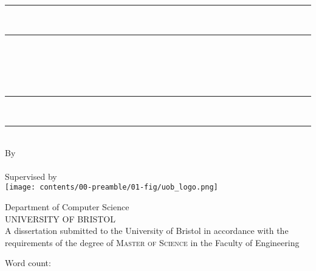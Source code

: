 \begin{titlepage}
    \centering

    \vspace*{2.2cm}

    \rule{\textwidth}{2pt} \\[-2ex]
    \rule{\textwidth}{0.5pt} \\[0.7cm]

    {\LARGE\bfseries \myReportTitle} \\[0.3cm]

    \parbox{0.89\textwidth}{\centering
        {\large \textit{\myReportSubtitle}}
    } \\[0.3cm]

    \rule{\textwidth}{0.5pt} \\[-2ex]
    \rule{\textwidth}{2pt} \\[0.3cm]

    {\large By} \\[0.3cm]
    {\large \myName} \\[0.3cm]
    {\normalsize Supervised by \mySupervisor} \\[1cm]

    \texttt{[image: contents/00-preamble/01-fig/uob\_logo.png]} \\[1cm]

    \begin{minipage}{0.65\textwidth}
        \centering
        {\Large Department of Computer Science} \\[0.3cm]
        {\Large \textsc{UNIVERSITY OF BRISTOL}} \\[1cm]
        {\normalsize A dissertation submitted to the University of Bristol
        in accordance with the requirements of the degree of \textsc{Master of Science}
        in the Faculty of Engineering} \\[1cm]
        {\large \mySubmissionMonthYear}
    \end{minipage}

    \vspace*{1cm}


    \begin{flushright}
        Word count: \wordCount
    \end{flushright}

    \vspace*{2.2cm}

\end{titlepage}